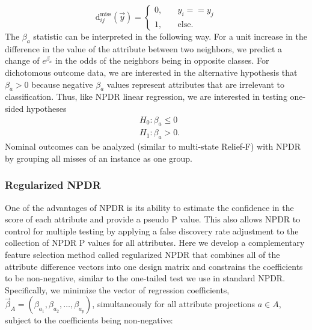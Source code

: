 \documentclass{bioinfo}
\begin{document}
\begin{equation}\label{eq:hitdiff}
\text{d}^{\text{miss}}_{ij}(\vec{y}) = \left\{
    \begin{array}{ll}
        0, & \quad  y_{i} == y_{j} \\
        1, & \quad \text{else}.
    \end{array}
\right.
\end{equation}
The $\beta_a$ statistic can be interpreted in the following way.
For a unit increase in the difference in the value of the attribute between two neighbors, we predict a change of $e^{\beta_a}$ in the odds of the neighbors being in opposite classes.
For dichotomous outcome data, we are interested in the alternative hypothesis that $\beta_a>0$ because negative $\beta_a$ values represent attributes that are irrelevant to classification.
Thus, like NPDR linear regression, we are interested in testing one-sided hypotheses
\begin{equation}
\begin{aligned}
    & H_0: \beta_a \le 0 \\
    & H_1: \beta_a > 0.
\end{aligned}
\end{equation}
Nominal outcomes can be analyzed (similar to multi-state Relief-F) with NPDR by grouping all misses of an instance as one group.

\subsubsection{Regularized NPDR}

One of the advantages of NPDR is its ability to estimate the confidence in the score of each attribute and provide a pseudo P value. This also allows NPDR to control for multiple testing by applying a false discovery rate adjustment to the collection of NPDR P values for all attributes. Here we develop a complementary feature selection method called regularized NPDR that combines all of the attribute difference vectors into one design matrix and constrains the coefficients to be non-negative, similar to the one-tailed test we use in standard NPDR.
Specifically, we minimize the vector of regression coefficients, $\vec{\beta}_A = (\beta_{a_1}, \beta_{a_2}, \ldots, \beta_{a_p})$, simultaneously for all attribute projections $a \in A$, subject to the coefficients being non-negative: 
\end{document}

